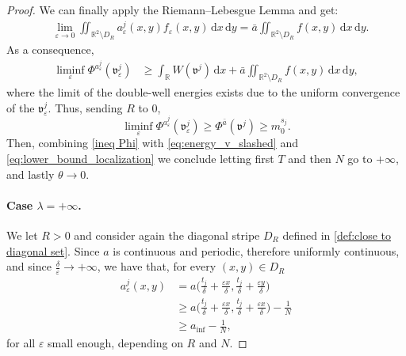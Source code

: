 \documentclass{article}
\theoremstyle{definition}
\newcommand{\abs}[1]{\left|#1\right|}
\newcommand{\de}{\mathrm{d}}
\newcommand{\R}{\mathbb{R}}
\newcommand{\e}{\varepsilon}
\def\e{\varepsilon}
\begin{document}
\begin{proof}
   We can finally apply the Riemann--Lebesgue Lemma and get:
    \begin{align*}
        &\lim_{\e\rightarrow0} \iint_{\R^2\setminus D_R}a^j_\e(x,y) f_\e(x,y) \,\de x\,\de y =\bar a\iint_{\R^2\setminus D_R}f(x,y) \,\de x\,\de y.
    \end{align*}
    As a consequence,
    \begin{align*}
        \liminf_\e \Phi^{a^{j}_{\scriptstyle\e}}(\mathfrak{v}_\e^j) 
        &\geq \int_\R W(\mathfrak v^j)\,\de x + \bar a\iint_{\R^2\setminus D_R} f(x,y) \,\de x\,\de y,
        \end{align*}
    where the limit of the double-well energies exists due to the uniform convergence of the $\mathfrak{v}^j_\e$. 
    Thus, sending $R$ to $0$, 
    \begin{equation}
    \label{ineq Phi}
        \liminf_\e \Phi^{a^{j}_{\scriptstyle\e}}(\mathfrak v^j_\e) \geq \Phi^{\bar a}(\mathfrak v^j) \geq m_0^{s_j}.
    \end{equation}
    Then, combining \eqref{ineq Phi} with \eqref{eq:energy_v_slashed} and \eqref{eq:lower_bound_localization} we conclude letting first $T$ and then $N$ go to $+\infty$, and lastly $\theta \to 0$.
\smallskip

\paragraph{Case $\lambda = +\infty$.} 
We let $R>0$ and consider again the diagonal stripe $D_R$ defined in \eqref{def:close to diagonal set}. Since $a$ is continuous and periodic, therefore uniformly continuous, and since $\frac{\delta}{\e}\rightarrow +\infty$, we have that, for every $(x,y)\in D_R$
\begin{equation*}
    \begin{split}
        a^j_\e(x,y) &= a\Big(\frac{t_j}{\delta}+ \frac{\e x}{\delta}, \frac{t_j}{\delta}+ \frac{\e y}{\delta} \Big) \\
        &\geq a\Big(\frac{t_j}{\delta}+ \frac{\e x}{\delta}, \frac{t_j}{\delta}+ \frac{\e x}{\delta} \Big)-\frac{1}{N} \\
        &\geq a_{\inf} -\frac{1}{N},
    \end{split}
\end{equation*}
   for all $\e$ small enough, depending on $R$ and $N$.
   

\end{proof}
\end{document}
